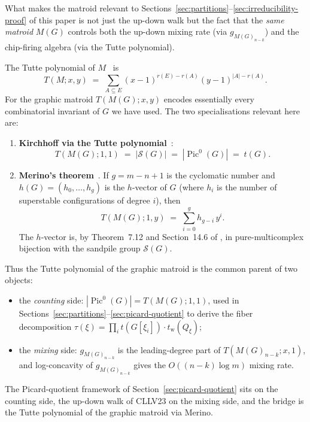 \documentclass[11pt]{article}
\newcommand{\Pic}{\operatorname{Pic}^0}
\newcommand{\tw}{t_{\mathrm{w}}}
\begin{document}
What makes the matroid relevant to Sections~\ref{sec:partitions}--\ref{sec:irreducibility-proof}
of this paper is not just the up-down walk but the fact that the
\emph{same matroid} $M(G)$ controls both the up-down mixing rate
(via $g_{M(G)_{n-k}}$) and the chip-firing algebra (via the Tutte
polynomial).

The Tutte polynomial of $M$~\cite[Definition~14.5]{corry2018divisors}
is
\[
  T(M; x, y) \;=\; \sum_{A \subseteq E} (x-1)^{r(E) - r(A)} (y - 1)^{|A| - r(A)}.
\]
For the graphic matroid $T(M(G); x, y)$ encodes essentially every
combinatorial invariant of $G$ we have used. The two specialisations
relevant here are:

\begin{enumerate}
  \item \textbf{Kirchhoff via the Tutte polynomial}~\cite[Corollary~14.19]{corry2018divisors}:
    \[
      T(M(G); 1, 1) \;=\; |\mathcal{S}(G)| \;=\; |\Pic(G)| \;=\; t(G).
    \]
  \item \textbf{Merino's theorem}~\cite[Theorem~14.18]{corry2018divisors}.
    If $g = m - n + 1$ is the cyclomatic number and
    $h(G) = (h_0, \ldots, h_g)$ is the $h$-vector of $G$ (where $h_i$
    is the number of superstable configurations of degree $i$), then
    \[
      T(M(G); 1, y) \;=\; \sum_{i=0}^{g} h_{g-i}\, y^i.
    \]
    The $h$-vector is, by Theorem~7.12 and Section~14.6 of
    \cite{corry2018divisors}, in pure-multicomplex bijection with the
    sandpile group $\mathcal{S}(G)$.
\end{enumerate}

\noindent Thus the Tutte polynomial of the graphic matroid is the
common parent of two objects:
\begin{itemize}
  \item the \emph{counting} side: $|\Pic(G)| = T(M(G); 1, 1)$, used in
    Sections~\ref{sec:partitions}--\ref{sec:picard-quotient} to derive
    the fiber decomposition $\tau(\xi) = \prod_i t(G[\xi_i]) \cdot \tw(Q_\xi)$;
  \item the \emph{mixing} side: $g_{M(G)_{n-k}}$ is the leading-degree
    part of $T(M(G)_{n-k}; x, 1)$, and log-concavity of $g_{M(G)_{n-k}}$
    gives the $O((n-k)\log m)$ mixing rate.
\end{itemize}

\noindent The Picard-quotient framework of Section~\ref{sec:picard-quotient}
sits on the counting side, the up-down walk of CLLV23 on the mixing side,
and the bridge is the Tutte polynomial of the graphic matroid via Merino.
\end{document}
